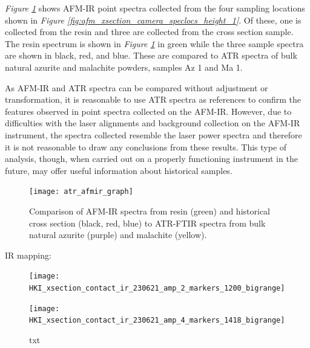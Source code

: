 \textit{Figure \ref{fig:atr_afmir_spectra}} shows AFM-IR point spectra collected from the four sampling locations shown in \textit{Figure \ref{fig:afm_xsection_camera_speclocs_height_1}}. Of these, one is collected from the resin and three are collected from the cross section sample. The resin spectrum is shown in \textit{Figure \ref{fig:atr_afmir_spectra}} in green while the three sample spectra are shown in black, red, and blue. These are compared to ATR spectra of bulk natural azurite and malachite powders, samples Az 1 and Ma 1. 

As AFM-IR and ATR spectra can be compared without adjustment or transformation, it is reasonable to use ATR spectra as references to confirm the features observed in point spectra collected on the AFM-IR. However, due to difficulties with the laser alignments and background collection on the AFM-IR instrument, the spectra collected resemble the laser power spectra and therefore it is not reasonable to draw any conclusions from these results. This type of analysis, though, when carried out on a properly functioning instrument in the future, may offer useful information about historical samples. 

\begin{figure}[H]
\centering
  \texttt{[image: atr\_afmir\_graph]}
\caption[Comparison of AFM-IR and ATR-FTIR spectra]{Comparison of AFM-IR spectra from resin (green) and historical cross section (black, red, blue) to ATR-FTIR spectra from bulk natural azurite (purple) and malachite (yellow).}
\label{fig:atr_afmir_spectra}
\end{figure}


IR mapping:

\begin{figure}[H]
\centering
\begin{minipage}{.45\textwidth}
  \centering
  \texttt{[image: HKI\_xsection\_contact\_ir\_230621\_amp\_2\_markers\_1200\_bigrange]}
\end{minipage}
\begin{minipage}{.45\textwidth}
  \centering
  \texttt{[image: HKI\_xsection\_contact\_ir\_230621\_amp\_4\_markers\_1418\_bigrange]}
\end{minipage}
\caption[txt]{txt}
\label{fig:afm_xsection_irmaps_1200_1418}
\end{figure}

